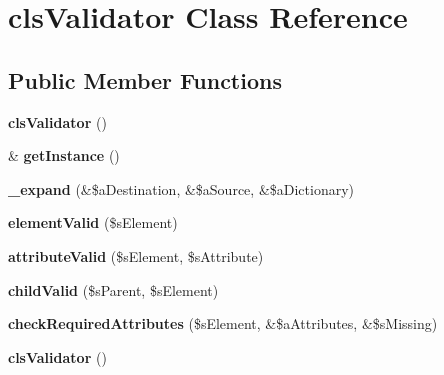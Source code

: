 \hypertarget{classclsValidator}{
\section{clsValidator Class Reference}
\label{classclsValidator}
}
\subsection*{Public Member Functions}
\begin{DoxyCompactItemize}
\item 
\hypertarget{classclsValidator_a7f9848419bb3f0aa7d86dee1188537fa}{
{\bfseries clsValidator} ()}
\label{classclsValidator_a7f9848419bb3f0aa7d86dee1188537fa}

\item 
\hypertarget{classclsValidator_ac5c8131a215a8943005ab282b651790f}{
\& {\bfseries getInstance} ()}
\label{classclsValidator_ac5c8131a215a8943005ab282b651790f}

\item 
\hypertarget{classclsValidator_a136befd3383ecc02e7494e518307a748}{
{\bfseries \_\-expand} (\&\$aDestination, \&\$aSource, \&\$aDictionary)}
\label{classclsValidator_a136befd3383ecc02e7494e518307a748}

\item 
\hypertarget{classclsValidator_a18014d79679b9d761ea61a9a60e6ce50}{
{\bfseries elementValid} (\$sElement)}
\label{classclsValidator_a18014d79679b9d761ea61a9a60e6ce50}

\item 
\hypertarget{classclsValidator_a22d1ffba9e945f368409aafd06e1825a}{
{\bfseries attributeValid} (\$sElement, \$sAttribute)}
\label{classclsValidator_a22d1ffba9e945f368409aafd06e1825a}

\item 
\hypertarget{classclsValidator_ad00141cb6054a23e5e9f4033b73609a4}{
{\bfseries childValid} (\$sParent, \$sElement)}
\label{classclsValidator_ad00141cb6054a23e5e9f4033b73609a4}

\item 
\hypertarget{classclsValidator_a022f10448d201d310f903c8b22202019}{
{\bfseries checkRequiredAttributes} (\$sElement, \&\$aAttributes, \&\$sMissing)}
\label{classclsValidator_a022f10448d201d310f903c8b22202019}

\item 
\hypertarget{classclsValidator_a7f9848419bb3f0aa7d86dee1188537fa}{
{\bfseries clsValidator} ()}
\label{classclsValidator_a7f9848419bb3f0aa7d86dee1188537fa}


\end{DoxyCompactItemize}

